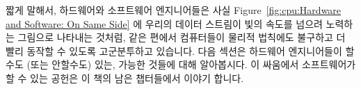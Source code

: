 짧게 말해서, 하드웨어와 소프트웨어 엔지니어들은 사실
Figure~\ref{fig:cpu:Hardware and Software: On Same Side} 에 우리의 데이터
스트림이 빛의 속도를 넘으려 노력하는 그림으로 나타내는 것처럼, 같은 편에서
컴퓨터들이 물리적 법칙에도 불구하고 더 빨리 동작할 수 있도록 고군분투하고
있습니다.
다음 섹션은 하드웨어 엔지니어들이 할수도 (또는 안할수도) 있는, 가능한 것들에
대해 알아봅시다.
이 싸움에서 소프트웨어가 할 수 있는 공헌은 이 책의 남은 챕터들에서 이야기
합니다.

